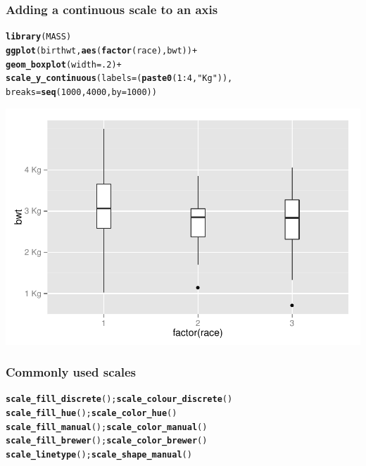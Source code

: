 \documentclass{beamer}\usepackage[]{graphicx}\usepackage[]{color}
\makeatletter
\newcommand{\hlnum}[1]{\textcolor[rgb]{0.686,0.059,0.569}{#1}}%
\newcommand{\hlstr}[1]{\textcolor[rgb]{0.192,0.494,0.8}{#1}}%
\newcommand{\hlopt}[1]{\textcolor[rgb]{0,0,0}{#1}}%
\newcommand{\hlstd}[1]{\textcolor[rgb]{0.345,0.345,0.345}{#1}}%
\newcommand{\hlkwc}[1]{\textcolor[rgb]{0.333,0.667,0.333}{#1}}%
\newcommand{\hlkwd}[1]{\textcolor[rgb]{0.737,0.353,0.396}{\textbf{#1}}}%
\newenvironment{kframe}{%
 \def\at@end@of@kframe{}%
 \ifinner\ifhmode%
  \def\at@end@of@kframe{\end{minipage}}%
  \begin{minipage}{\columnwidth}%
 \fi\fi%
 \def\FrameCommand##1{\hskip\@totalleftmargin \hskip-\fboxsep
 \colorbox{shadecolor}{##1}\hskip-\fboxsep
     \hskip-\linewidth \hskip-\@totalleftmargin \hskip\columnwidth}%
 \MakeFramed {\advance\hsize-\width
   \@totalleftmargin\z@ \linewidth\hsize
   \@setminipage}}%
 {\par\unskip\endMakeFramed%
 \at@end@of@kframe}
\newenvironment{knitrout}{}{} %
\makeatother
\begin{document}

\begin{frame}[fragile]
\frametitle{Adding a continuous scale to an axis}
\begin{knitrout}\footnotesize
{}\color{fgcolor}\begin{kframe}
\begin{alltt}
\hlkwd{library}\hlstd{(MASS)}
\hlkwd{ggplot}\hlstd{(birthwt,} \hlkwd{aes}\hlstd{(}\hlkwd{factor}\hlstd{(race), bwt))} \hlopt{+}
\hlkwd{geom_boxplot}\hlstd{(}\hlkwc{width} \hlstd{=} \hlnum{.2}\hlstd{)} \hlopt{+}
\hlkwd{scale_y_continuous}\hlstd{(}\hlkwc{labels} \hlstd{= (}\hlkwd{paste0}\hlstd{(}\hlnum{1}\hlopt{:}\hlnum{4}\hlstd{,} \hlstr{" Kg"}\hlstd{)),}
\hlkwc{breaks} \hlstd{=} \hlkwd{seq}\hlstd{(}\hlnum{1000}\hlstd{,} \hlnum{4000}\hlstd{,} \hlkwc{by} \hlstd{=} \hlnum{1000}\hlstd{))}
\end{alltt}
\end{kframe}

{\centering \includegraphics[width=.75\linewidth]{figure/boxplots3} 

}



\end{knitrout}
\end{frame}


\begin{frame}[fragile]
\frametitle{Commonly used scales}
\begin{knitrout}\footnotesize
{}\color{fgcolor}\begin{kframe}
\begin{alltt}
\hlkwd{scale_fill_discrete}\hlstd{();} \hlkwd{scale_colour_discrete}\hlstd{()}
\hlkwd{scale_fill_hue}\hlstd{();} \hlkwd{scale_color_hue}\hlstd{()}
\hlkwd{scale_fill_manual}\hlstd{();}  \hlkwd{scale_color_manual}\hlstd{()}
\hlkwd{scale_fill_brewer}\hlstd{();} \hlkwd{scale_color_brewer}\hlstd{()}
\hlkwd{scale_linetype}\hlstd{();} \hlkwd{scale_shape_manual}\hlstd{()}
\end{alltt}
\end{kframe}
\end{knitrout}
\end{frame}
\end{document}
